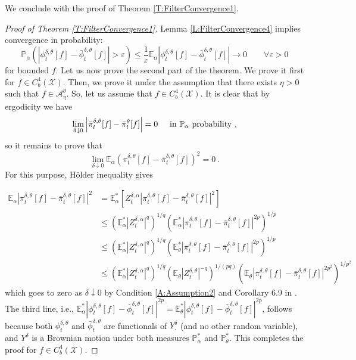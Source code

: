 \documentclass{article}
\newcommand{\eps}{\varepsilon}
\begin{document}
We conclude with the proof of Theorem \ref{T:FilterConvergence1}.


\begin{proof}[Proof of Theorem \ref{T:FilterConvergence1}]
Lemma \ref{L:FilterConvergence4} implies convergence in probability:
\[\mathbb P_{\alpha}\left(\left|\phi_t^{\delta,\theta}[f]-\bar\phi_t^{\delta,\theta}[f]\right|>\eps\right)\leq \frac{1}{\eps}\mathbb E_{\alpha}\left|\phi_t^{\delta,\theta}[f]-\bar\phi_t^{\delta,\theta}[f]\right|\rightarrow 0\qquad\forall\eps>0\]
for bounded $f$. Let us now prove the second part of the theorem. We prove it first for $f\in C^{4}_{b}(\mathcal{X})$. Then, we prove it under the assumption that there exists $\eta>0$ such that $f\in\mathcal{A}_{\eta}^{\theta}$. So, let us assume that $f\in C^{4}_{b}(\mathcal{X})$. It is clear that by ergodicity we have
\[\lim_{\delta\downarrow 0}\left|\bar \pi_t^{\delta,\theta}[f]-\bar \pi_t^{\theta}[f]\right|=0\hspace{.5cm}\hbox{in $\mathbb P_\alpha$ probability}\ ,\]
so it remains to prove that
\[\lim_{\delta\downarrow 0}\mathbb E_{\alpha}\left(\pi_t^{\delta,\theta}[f]-\bar \pi_t^{\delta, \theta}[f]\right)^2=0\ . \]
For this purpose, H\"{o}lder inequality gives

\begin{align}
\mathbb E_{\alpha}\left|\pi_t^{\delta,\theta}[f]-\bar{\pi}_t^{\delta,\theta}[f]\right|^{2}&=
\mathbb E^{*}_{\alpha}\left[Z^{\delta,\alpha}_{t}\left|\pi_t^{\delta,\theta}[f]-\bar{\pi}_t^{\delta,\theta}[f]\right|^{2}\right]\nonumber\\
&\leq
 \left(\mathbb E^{*}_{\alpha}\left|Z^{\delta,\alpha}_{t}\right|^{q}\right)^{1/q}\left(\mathbb E^{*}_{\alpha}\left|\pi_t^{\delta,\theta}[f]-\bar{\pi}_t^{\delta,\theta}[f]\right|^{2p}\right)^{1/p}\nonumber\\
&\leq
 \left(\mathbb E^{*}_{\alpha}\left|Z^{\delta,\alpha}_{t}\right|^{q}\right)^{1/q}\left(\mathbb E^{*}_{\theta}\left|\pi_t^{\delta,\theta}[f]-\bar{\pi}_t^{\delta,\theta}[f]\right|^{2p}\right)^{1/p}\nonumber\\
 &\leq
 \left(\mathbb E^{*}_{\alpha}\left|Z^{\delta,\alpha}_{t}\right|^{q}\right)^{1/q} \left(\mathbb E_{\theta}\left|Z^{\delta,\theta}_{t}\right|^{-q}\right)^{1/(pq)}\left(\mathbb E_{\theta}\left|\pi_t^{\delta,\theta}[f]-\bar{\pi}_t^{\delta,\theta}[f]\right|^{2p^{2}}\right)^{1/p^{2}}\nonumber
\end{align}
which goes to zero as $\delta\downarrow 0$ by Condition \ref{A:Assumption2} and Corollary 6.9 in \cite{ImkellerSriPerkowskiYeong2012}. The third line,  i.e., $\mathbb E_{\alpha}^*\left|\phi_t^{\delta,\theta}[f]-\bar{\phi}_t^{\delta,\theta}[f]\right|^{2p}=\mathbb E_{\theta}^*\left|\phi_t^{\delta,\theta}[f]-\bar{\phi}_t^{\delta,\theta}[f]\right|^{2p}$, follows because both $\phi_t^{\delta,\theta}$ and $\bar\phi_t^{\delta,\theta}$ are functionals of $Y^\delta_{\cdot}$ (and no other random variable), and $Y^\delta$ is a Brownian motion under both measures $\mathbb P_{\alpha}^*$ and $\mathbb{P}_{\theta}^*$. This completes the proof for $f\in C^{4}_{b}(\mathcal{X})$.


\end{proof}
\end{document}
